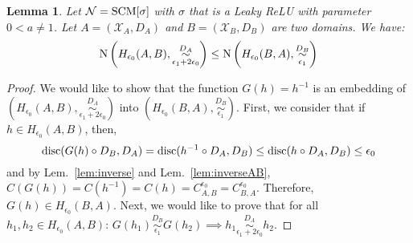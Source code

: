\documentclass{article} %
\newtheorem{lem}{Lemma}
\newcommand{\disc}{\textnormal{disc}}
\newcommand{\Cov}{\textnormal{N}}
\begin{document}
 

\begin{lem}\label{lem:covinv} Let $\mathcal{N} = \textnormal{SCM}[\sigma]$ with $\sigma$ that is a Leaky ReLU with parameter $0< a \neq 1$. Let $A = (\mathcal{X}_A,D_A)$ and $B = (\mathcal{X}_B, D_B)$ are two domains. We have:
\begin{equation}
\Cov\left(H_{\epsilon_0}(A,B),\overset{D_A}{\underset{\epsilon_1+2\epsilon_0}{\sim}}\right) \leq \Cov\left(H_{\epsilon_0}(B,A),\overset{D_B}{\underset{\epsilon_1}{\sim}}\right)
\end{equation}
\end{lem}

 

\begin{proof} We would like to show that the function $G(h) = h^{-1}$ is an embedding of $\left(H_{\epsilon_0}(A,B),\overset{D_A}{\underset{\epsilon_1+2\epsilon_0}{\sim}}\right)$ into $\left(H_{\epsilon_0}(B,A),\overset{D_B}{\underset{\epsilon_1}{\sim}}\right)$. First, we consider that if $h \in H_{\epsilon_0}(A,B)$, then, 
\begin{equation}
\disc( G(h) \circ D_B,D_A) = \disc(h^{-1} \circ D_A,D_B) \leq \disc(h \circ D_A,D_B) \leq \epsilon_0
\end{equation}
and by Lem.~\ref{lem:inverse} and Lem.~\ref{lem:inverseAB}, $C(G(h)) = C(h^{-1}) = C(h) = C^{\epsilon_0}_{A,B} = C^{\epsilon_0}_{B,A}$. Therefore, $G(h) \in H_{\epsilon_0}(B,A)$. Next, we would like to prove that for all $h_1,h_2 \in H_{\epsilon_0}(A,B)$: $G(h_1) \overset{D_B}{\underset{\epsilon_1}{\sim}} G(h_2) \implies h_1 \overset{D_A}{\underset{\epsilon_1+2\epsilon_0}{\sim}} h_2$. 


\end{proof}
\end{document}
